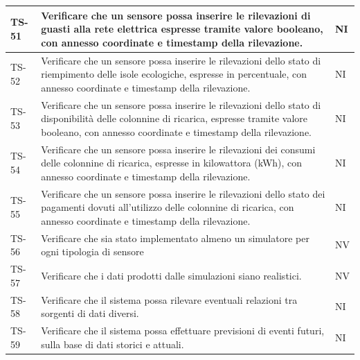 \documentclass[8pt]{article}
\begin{document}
\begin{longtable}{|>{\centering}p{2cm}|>{\RaggedRight}m{12cm}|>{\centering\arraybackslash}p{2cm}|}
    \hline
    TS-51 & Verificare che un sensore possa inserire le rilevazioni di guasti alla rete elettrica espresse tramite valore booleano, con annesso coordinate e timestamp della rilevazione. & NI \\
    \hline
    TS-52 & Verificare che un sensore possa inserire le rilevazioni dello stato di riempimento delle isole ecologiche,
    espresse in percentuale, con annesso coordinate e timestamp della rilevazione. & NI \\
    \hline
    TS-53 & Verificare che un sensore possa inserire le rilevazioni dello stato di disponibilità delle colonnine di ricarica,
    espresse tramite valore booleano, con annesso coordinate e timestamp della rilevazione. & NI \\
    \hline
    TS-54 & Verificare che un sensore possa inserire le rilevazioni dei consumi delle colonnine di ricarica,
    espresse in kilowattora (kWh), con annesso coordinate e timestamp della rilevazione. & NI \\
    \hline
    TS-55 & Verificare che un sensore possa inserire le rilevazioni dello stato dei pagamenti dovuti all'utilizzo delle colonnine di ricarica, con annesso coordinate e timestamp della rilevazione. & NI \\
    \hline
    TS-56 & Verificare che sia stato implementato almeno un simulatore per ogni tipologia di sensore
    & NV \\
    \hline
    TS-57 & Verificare che i dati prodotti dalle simulazioni siano realistici. & NV \\
    \hline
    TS-58 & Verificare che il sistema possa rilevare eventuali relazioni tra sorgenti di dati
    diversi. & NI \\
    \hline
    TS-59 & Verificare che il sistema possa effettuare previsioni di eventi futuri, sulla base di dati storici e attuali. & NI \\
    \hline
\end{longtable}
\clearpage
\end{document}
